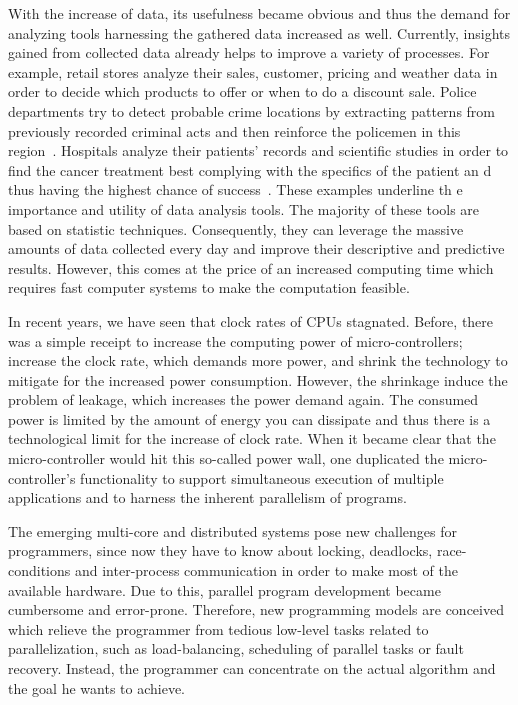 \documentclass{dima}
\begin{document}
 With the increase of data, its usefulness became obvious and thus the demand for analyzing tools harnessing the gathered data increased as well.
 Currently, insights gained from collected data already helps to improve a variety of processes.
 For example, retail stores analyze their sales, customer, pricing and weather data in order to decide which products to offer or  when to do a discount sale. 
 Police departments try to detect probable crime locations by extracting patterns from previously recorded criminal acts and then  reinforce the policemen in  this region~\cite{lohr:yt2012a}. 
 Hospitals analyze their patients' records and scientific studies in order to find the cancer treatment best complying with the  specifics of the patient an d thus having the highest chance  of success~\cite{mskcc:2013a}. 
 These examples underline th e importance and utility of data  analysis tools. 
 The majority of these tools are based on statistic techniques. 
 Consequently, they can leverage the massive amounts of data collected every day and improve their descriptive and predictive results.
 However, this comes at the price of an increased computing time which requires fast computer systems to make the computation feasible.

 In recent years, we have seen that clock rates of CPUs stagnated.
 Before, there was a simple receipt to increase the computing power of micro-controllers; increase the clock rate, which demands more power, and shrink the technology to mitigate for the increased power consumption.
 However, the shrinkage induce the problem of leakage, which increases the power demand again.
 The consumed power is limited by the amount of energy you can dissipate and thus there is a technological limit for the increase of clock rate.
 When it became clear that the micro-controller would hit this so-called power wall, one duplicated the micro-controller's functionality to support simultaneous execution of multiple applications and to harness the inherent parallelism of programs.

 The emerging multi-core and distributed systems pose new challenges for programmers, since now they have to know about locking, deadlocks, race-conditions and inter-process communication in order to make most of the available hardware.
 Due to this, parallel program development became cumbersome and error-prone.
 Therefore, new programming models are conceived which relieve the programmer from tedious low-level tasks related to parallelization, such as load-balancing, scheduling of parallel tasks or fault recovery.
 Instead, the programmer can concentrate on the actual algorithm and the goal he wants to achieve.
 
\end{document}
